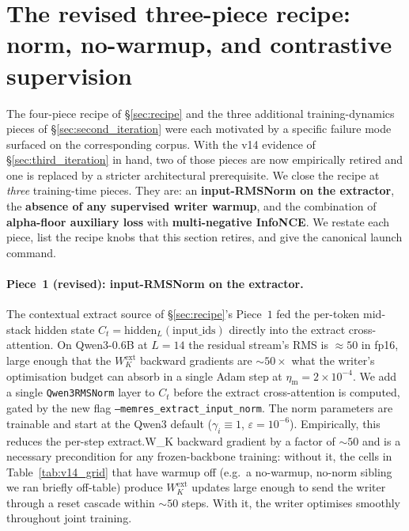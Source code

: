 %
%

\section{The revised three-piece recipe: norm, no-warmup, and contrastive supervision}
\label{sec:revised_recipe}

The four-piece recipe of \S\ref{sec:recipe} and the three additional
training-dynamics pieces of \S\ref{sec:second_iteration} were each
motivated by a specific failure mode surfaced on the corresponding
corpus. With the v14 evidence of \S\ref{sec:third_iteration} in
hand, two of those pieces are now empirically retired and one is
replaced by a stricter architectural prerequisite. We close the
recipe at \emph{three} training-time pieces. They are: an
\textbf{input-RMSNorm on the extractor}, the \textbf{absence of any
supervised writer warmup}, and the combination of
\textbf{alpha-floor auxiliary loss} with \textbf{multi-negative
InfoNCE}. We restate each piece, list the recipe knobs that this
section retires, and give the canonical launch command.

\paragraph{Piece~1 (revised): input-RMSNorm on the extractor.}
The contextual extract source of \S\ref{sec:recipe}'s Piece~$1$
fed the per-token mid-stack hidden state $C_t =
\mathrm{hidden}_L(\text{input\_ids})$ directly into the extract
cross-attention. On Qwen3-0.6B at $L{=}14$ the residual stream's
RMS is $\approx 50$ in fp16, large enough that the
$W_K^{\text{ext}}$ backward gradients are
$\sim\!50\times$ what the writer's optimisation budget can absorb
in a single Adam step at $\eta_{\text{m}}{=}2\!\times\!10^{-4}$. We
add a single \texttt{Qwen3RMSNorm} layer to $C_t$ before the
extract cross-attention is computed, gated by the new flag
\texttt{--memres\_extract\_input\_norm}. The norm parameters are
trainable and start at the Qwen3 default
($\gamma_i \equiv 1$, $\varepsilon{=}10^{-6}$). Empirically, this
reduces the per-step extract.W\_K backward gradient by a factor
of $\sim\!50$ and is a necessary precondition for any
frozen-backbone training: without it, the cells in
Table~\ref{tab:v14_grid} that have warmup off (e.g.\ a no-warmup,
no-norm sibling we ran briefly off-table) produce
$W_K^{\text{ext}}$ updates large enough to send the writer
through a reset cascade within $\sim\!50$ steps. With it,
the writer optimises smoothly throughout joint training.

